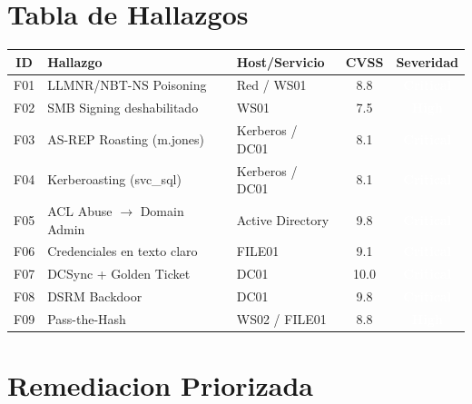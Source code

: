 \documentclass[11pt,a4paper]{article}
\begin{document}
\section{Tabla de Hallazgos}

\begin{center}
\begin{tabularx}{\textwidth}{clXcc}
\toprule
\textbf{ID} & \textbf{Hallazgo} & \textbf{Host/Servicio} & \textbf{CVSS} & \textbf{Severidad} \\
\midrule
F01 & LLMNR/NBT-NS Poisoning        & Red / WS01       & 8.8  & \cellcolor{critical!80}\textcolor{white}{\textbf{Critical}} \\
F02 & SMB Signing deshabilitado      & WS01             & 7.5  & \cellcolor{high!70}\textcolor{white}{\textbf{High}} \\
F03 & AS-REP Roasting (m.jones)      & Kerberos / DC01  & 8.1  & \cellcolor{critical!80}\textcolor{white}{\textbf{Critical}} \\
F04 & Kerberoasting (svc\_sql)       & Kerberos / DC01  & 8.1  & \cellcolor{critical!80}\textcolor{white}{\textbf{Critical}} \\
F05 & ACL Abuse $\to$ Domain Admin   & Active Directory & 9.8  & \cellcolor{critical!80}\textcolor{white}{\textbf{Critical}} \\
F06 & Credenciales en texto claro    & FILE01           & 9.1  & \cellcolor{critical!80}\textcolor{white}{\textbf{Critical}} \\
F07 & DCSync + Golden Ticket         & DC01             & 10.0 & \cellcolor{critical!80}\textcolor{white}{\textbf{Critical}} \\
F08 & DSRM Backdoor                  & DC01             & 9.8  & \cellcolor{critical!80}\textcolor{white}{\textbf{Critical}} \\
F09 & Pass-the-Hash                  & WS02 / FILE01    & 8.8  & \cellcolor{high!70}\textcolor{white}{\textbf{High}} \\
\bottomrule
\end{tabularx}
\end{center}

\vspace{0.5cm}

\section{Remediacion Priorizada}
\end{document}
